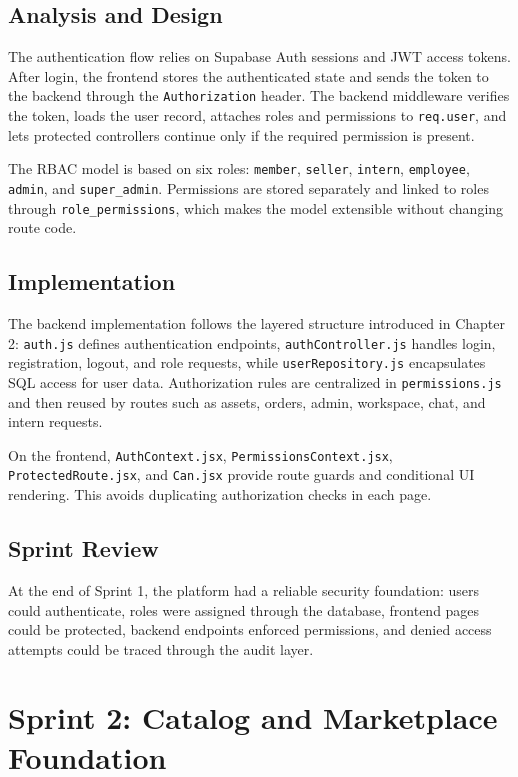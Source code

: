 \subsection{Analysis and Design}

The authentication flow relies on Supabase Auth sessions and JWT access tokens. After login,
the frontend stores the authenticated state and sends the token to the backend through the
\texttt{Authorization} header. The backend middleware verifies the token, loads the user
record, attaches roles and permissions to \texttt{req.user}, and lets protected controllers
continue only if the required permission is present.

The RBAC model is based on six roles: \texttt{member}, \texttt{seller}, \texttt{intern},
\texttt{employee}, \texttt{admin}, and \texttt{super\_admin}. Permissions are stored
separately and linked to roles through \texttt{role\_permissions}, which makes the model
extensible without changing route code.

\subsection{Implementation}

The backend implementation follows the layered structure introduced in Chapter 2:
\texttt{auth.js} defines authentication endpoints, \texttt{authController.js} handles login,
registration, logout, and role requests, while \texttt{userRepository.js} encapsulates SQL
access for user data. Authorization rules are centralized in \texttt{permissions.js} and
then reused by routes such as assets, orders, admin, workspace, chat, and intern requests.

On the frontend, \texttt{AuthContext.jsx}, \texttt{PermissionsContext.jsx},
\texttt{ProtectedRoute.jsx}, and \texttt{Can.jsx} provide route guards and conditional UI
rendering. This avoids duplicating authorization checks in each page.

\subsection{Sprint Review}

At the end of Sprint 1, the platform had a reliable security foundation: users could
authenticate, roles were assigned through the database, frontend pages could be protected,
backend endpoints enforced permissions, and denied access attempts could be traced through
the audit layer.

\section{Sprint 2: Catalog and Marketplace Foundation}

